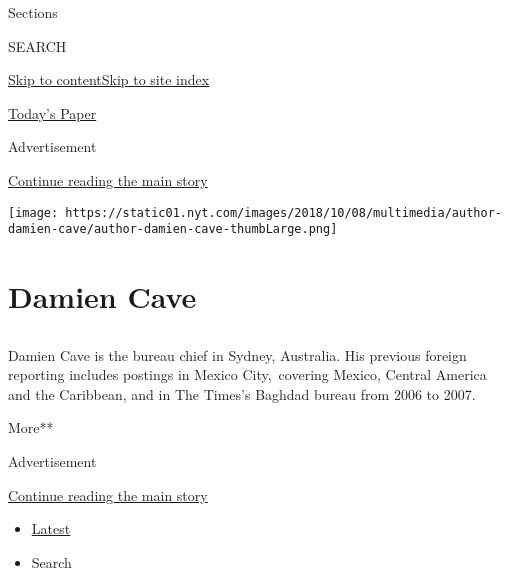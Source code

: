 Sections

SEARCH

\protect\hyperlink{site-content}{Skip to
content}\protect\hyperlink{site-index}{Skip to site index}

\href{https://myaccount.nytimes.com/auth/login?response_type=cookie\&client_id=vi}{}

\href{https://www.nytimes.com/section/todayspaper}{Today's Paper}

Advertisement

\protect\hyperlink{after-top}{Continue reading the main story}

\texttt{[image: https://static01.nyt.com/images/2018/10/08/multimedia/author-damien-cave/author-damien-cave-thumbLarge.png]}

\hypertarget{damien-cave}{%
\section{Damien Cave}\label{damien-cave}}

\subsection{}

Damien Cave is the bureau chief in Sydney, Australia. His previous
foreign reporting includes postings in Mexico City,~covering Mexico,
Central America and the Caribbean, and in The Times's Baghdad bureau
from 2006 to 2007.

More**

Advertisement

\protect\hyperlink{after-mid1}{Continue reading the main story}

\begin{itemize}
\tightlist
\item
  \protect\hyperlink{stream-panel}{Latest}
\item
  Search
\end{itemize}

